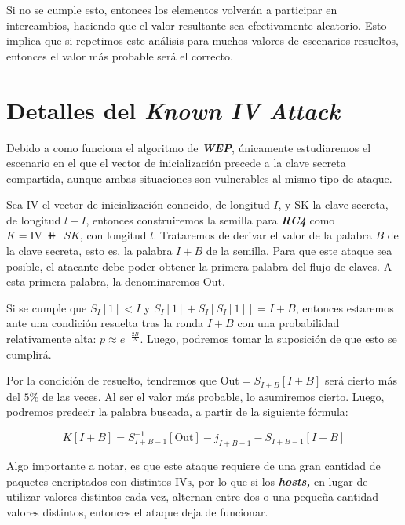\documentclass[
]{article}
\begin{document}
Si no se cumple esto, entonces los elementos volverán a participar en
intercambios, haciendo que el valor resultante sea efectivamente
aleatorio. Esto implica que si repetimos este análisis para muchos
valores de escenarios resueltos, entonces el valor más probable será el
correcto.

\hypertarget{detalles-del-known-iv-attack}{%
\section{\texorpdfstring{Detalles del \textbf{\emph{Known IV
Attack}}}{Detalles del Known IV Attack}}\label{detalles-del-known-iv-attack}}

Debido a como funciona el algoritmo de \textbf{\emph{WEP}}, únicamente
estudiaremos el escenario en el que el vector de inicialización precede
a la clave secreta compartida, aunque ambas situaciones son vulnerables
al mismo tipo de ataque.

Sea \(\text{IV}\) el vector de inicialización conocido, de longitud
\(I\), y \(\text{SK}\) la clave secreta, de longitud \(l - I\), entonces
construiremos la semilla para \textbf{\emph{RC4}} como
\(K = \text{IV}\ ⧺\ \ SK\), con longitud \(l\). Trataremos de derivar el
valor de la palabra \(B\) de la clave secreta, esto es, la palabra
\(I + B\) de la semilla. Para que este ataque sea posible, el atacante
debe poder obtener la primera palabra del flujo de claves. A esta
primera palabra, la denominaremos \(\text{Out}\).

Si se cumple que \(S_I[1] < I\) y \(S_I[1] + S_I[S_I[1]] = I+B\),
entonces estaremos ante una condición resuelta tras la ronda \(I + B\)
con una probabilidad relativamente alta: \(p\approx e^{-\frac{2B}N}\).
Luego, podremos tomar la suposición de que esto se cumplirá.

Por la condición de resuelto, tendremos que
\(\text{Out} = S_{I+B}[I+B]\) será cierto más del \(5\%\) de las veces.
Al ser el valor más probable, lo asumiremos cierto. Luego, podremos
predecir la palabra buscada, a partir de la siguiente fórmula:

\[
K[I+B] = S_{I+B-1}^{-1}[\text{Out}] - j_{I+B-1} - S_{I+B-1}[I+B]
\]

Algo importante a notar, es que este ataque requiere de una gran
cantidad de paquetes encriptados con distintos \(\text{IVs}\), por lo
que si los \textbf{\emph{hosts,}} en lugar de utilizar valores distintos
cada vez, alternan entre dos o una pequeña cantidad valores distintos,
entonces el ataque deja de funcionar.
\end{document}
